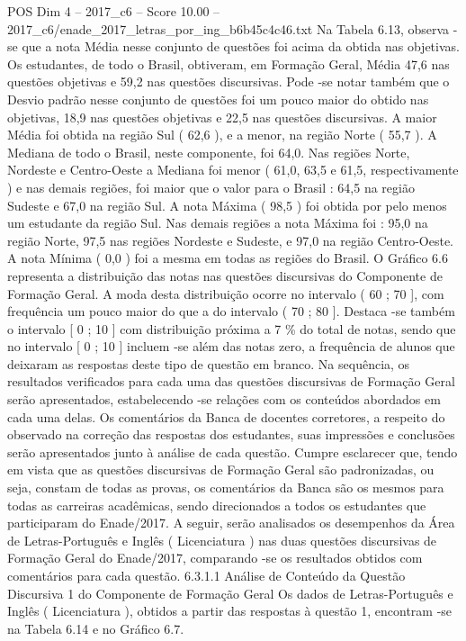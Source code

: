 \begin{textsample}{POS Dim 4 – 2017\_c6 – Score 10.00 – 2017\_c6/enade\_2017\_letras\_por\_ing\_b6b45c4c46.txt}
Na Tabela 6.13, observa -se que a nota Média nesse conjunto de questões foi acima da obtida nas objetivas.
Os estudantes, de todo o Brasil, obtiveram, em Formação Geral, Média 47,6 nas questões objetivas e 59,2 nas questões discursivas.
Pode -se notar também que o Desvio padrão nesse conjunto de questões foi um pouco maior do obtido nas objetivas, 18,9 nas questões objetivas e 22,5 nas questões discursivas.
A maior Média foi obtida na região Sul ( 62,6 ), e a menor, na região Norte ( 55,7 ).
A Mediana de todo o Brasil, neste componente, foi 64,0.
Nas regiões Norte, Nordeste e Centro-Oeste a Mediana foi menor ( 61,0, 63,5 e 61,5, respectivamente ) e nas demais regiões, foi maior que o valor para o Brasil : 64,5 na região Sudeste e 67,0 na região Sul.
A nota Máxima ( 98,5 ) foi obtida por pelo menos um estudante da região Sul.
Nas demais regiões a nota Máxima foi : 95,0 na região Norte, 97,5 nas regiões Nordeste e Sudeste, e 97,0 na região Centro-Oeste.
A nota Mínima ( 0,0 ) foi a mesma em todas as regiões do Brasil.
O Gráfico 6.6 representa a distribuição das notas nas questões discursivas do Componente de Formação Geral.
A moda desta distribuição ocorre no intervalo ( 60 ; 70 ], com frequência um pouco maior do que a do intervalo ( 70 ; 80 ].
Destaca -se também o intervalo [ 0 ; 10 ] com distribuição próxima a 7 \% do total de notas, sendo que no intervalo [ 0 ; 10 ] incluem -se além das notas zero, a frequência de alunos que deixaram as respostas deste tipo de questão em branco.
Na sequência, os resultados verificados para cada uma das questões discursivas de Formação Geral serão apresentados, estabelecendo -se relações com os conteúdos abordados em cada uma delas.
Os comentários da Banca de docentes corretores, a respeito do observado na correção das respostas dos estudantes, suas impressões e conclusões serão apresentados junto à análise de cada questão.
Cumpre esclarecer que, tendo em vista que as questões discursivas de Formação Geral são padronizadas, ou seja, constam de todas as provas, os comentários da Banca são os mesmos para todas as carreiras acadêmicas, sendo direcionados a todos os estudantes que participaram do Enade/2017.
A seguir, serão analisados os desempenhos da Área de Letras-Português e Inglês ( Licenciatura ) nas duas questões discursivas de Formação Geral do Enade/2017, comparando -se os resultados obtidos com comentários para cada questão. 6.3.1.1 Análise de Conteúdo da Questão Discursiva 1 do Componente de Formação Geral Os dados de Letras-Português e Inglês ( Licenciatura ), obtidos a partir das respostas à questão 1, encontram -se na Tabela 6.14 e no Gráfico 6.7.

\end{textsample}
